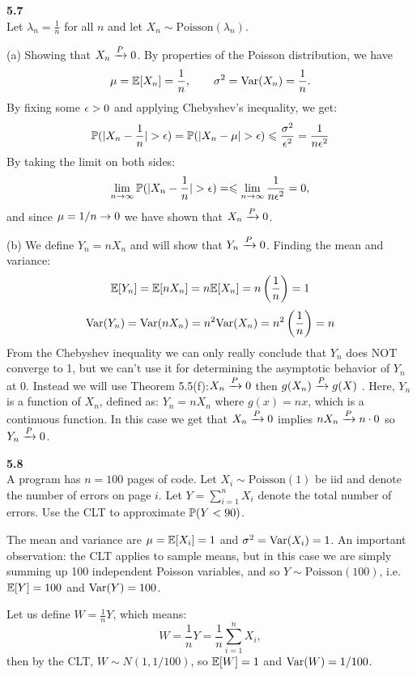  \newpage\noindent
 \textbf{5.7}\\  %
 Let $\lambda_n = \frac{1}{n}$ for all $n$ and let $X_n\sim\text{Poisson}(\lambda_n)$.

 \medskip\noindent(a) Showing that $X_n \raP 0$. By properties of the Poisson
 distribution, we have
 $$
\mu = \E[X_n] = \frac{1}{n},\qquad \sigma^2 = \V(X_n) = \frac{1}{n}.
 $$
 By fixing some $\eps > 0$ and applying Chebyshev's inequality, we get:
 $$
 \P(|X_n - \frac{1}{n}| > \eps) = \P(|X_n - \mu| > \eps) \leq \frac{\sigma^2}{\eps^2} = \frac{1}{n\eps^2}
 $$
By taking the limit on both sides:
$$
\lim_{n\ra\infty}\P(|X_n - \frac{1}{n}| > \eps) =  \leq \lim_{n\ra\infty}\frac{1}{n\eps^2} = 0,
$$
and since $\mu = 1/n \ra 0$ we have shown that $X_n\raP 0$.

\medskip\noindent(b) We define $Y_n = nX_n$ and will show that $Y_n\raP 0$.
Finding the mean and variance:
$$
\E[Y_n] = \E[nX_n] = n\E[X_n] = n\left(\frac{1}{n}\right) = 1
$$
$$
\V(Y_n) = \V(nX_n) = n^2\V(X_n) = n^2\left(\frac{1}{n}\right) = n
$$
From the Chebyshev inequality we can only really conclude that $Y_n$ does NOT converge to 1,
but we can't use it for determining the asymptotic behavior of $Y_n$ at 0. Instead we will
use Theorem 5.5(f):$X_n \raP 0$ then $g(X_n)\raP g(X)$ . Here, $Y_n$ is a function of $X_n$,
defined as: $Y_n = nX_n$ where $g(x) = nx$, which is a continuous function.
In this case we get that $X_n \raP 0$ implies $nX_n\raP n\cdot 0$ so $Y_n \raP 0$.

\bigskip\noindent
\textbf{5.8}\\  %
A program has $n=100$ pages of code. Let $X_i\sim\text{Poisson}(1)$ be iid and denote the
number of errors on page $i$. Let $Y = \sum_{i=1}^n X_i$ denote the total
number of errors. Use the CLT to approximate $\P(Y < 90)$.

\medskip\noindent The mean and variance are $\mu = \E[X_i] = 1$ and $\sigma^2 = \V(X_i) = 1$.
An important observation: the CLT applies to sample means, but in this case we are simply
summing up 100 independent Poisson variables, and so $Y\sim\text{Poisson}(100)$,
i.e. $\E[Y] = 100$ and $\V(Y) = 100$.

Let us define $W = \frac{1}{n}Y$, which means:
$$
W = \frac{1}{n}Y = \frac{1}{n}\sum_{i=1}^n X_i,
$$
then by the CLT, $W\sim N(1, 1/100)$, so $\E[W] = 1$ and $\V(W) = 1/100$.

